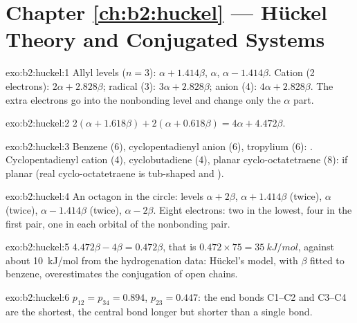 \section*{Chapter \ref{ch:b2:huckel} --- H\"uckel Theory and Conjugated Systems}

\begin{solution}{exo:b2:huckel:1}
Allyl levels ($n = 3$): $\alpha + 1.414\beta$, $\alpha$, $\alpha - 1.414\beta$. Cation (2 electrons):
$2\alpha + 2.828\beta$; radical (3): $3\alpha + 2.828\beta$; anion (4): $4\alpha + 2.828\beta$. The extra
electrons go into the nonbonding level and change only the $\alpha$ part.
\end{solution}

\begin{solution}{exo:b2:huckel:2}
$2(\alpha + 1.618\beta) + 2(\alpha + 0.618\beta) = 4\alpha + 4.472\beta$.
\end{solution}

\begin{solution}{exo:b2:huckel:3}
Benzene (6), cyclopentadienyl anion (6), tropylium (6): . Cyclopentadienyl
cation (4), cyclobutadiene (4), planar cyclo-octatetraene (8):  if planar
(real cyclo-octatetraene is tub-shaped and ).
\end{solution}

\begin{solution}{exo:b2:huckel:4}
An octagon in the circle: levels $\alpha + 2\beta$, $\alpha + 1.414\beta$ (twice), $\alpha$ (twice),
$\alpha - 1.414\beta$ (twice), $\alpha - 2\beta$. Eight electrons: two in the lowest, four in the
first pair, one in each orbital of the nonbonding pair.
\end{solution}

\begin{solution}{exo:b2:huckel:5}
$4.472\beta - 4\beta = 0.472\beta$, that is $0.472 \times 75 = \qty{35}{kJ/mol}$, against about
\qty{10}{kJ/mol} from the hydrogenation data: H\"uckel's model, with $\beta$ fitted to benzene,
overestimates the conjugation of open chains.
\end{solution}

\begin{solution}{exo:b2:huckel:6}
$p_{12} = p_{34} = 0.894$, $p_{23} = 0.447$: the end bonds C1--C2 and C3--C4 are the
shortest, the central bond longer but shorter than a single bond.
\end{solution}


